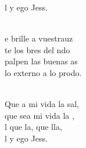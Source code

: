 \documentclass[12pt]{article}
\begin{document}
\begin{multicols*}{2}
\begin{cancion}
\begin{chorus}
	l y ego Jess.\\
	\end{chorus}%
	\jump\\
	e brille a vuestrauz\\
	te los bres del ndo\\
	 palpen las buenas as\\
	 lo externo a lo prodo.\\\jump\\
	\begin{chorus}%
	Que a mi vida la sal,\\
	que sea mi vida la ,\\
	l que la,  que lla,\\
	l y ego Jess.\\
	\end{chorus}%
	\jump\\
\end{cancion}%


\end{multicols*}
\end{document}
